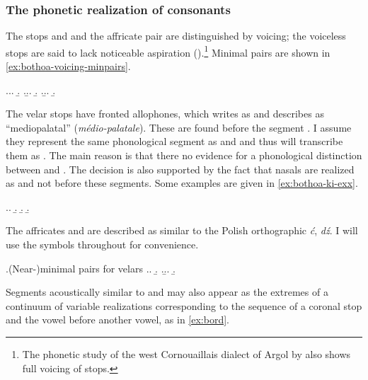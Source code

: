 \subsubsection{The phonetic realization of consonants}
\label{sec:phon-real-cons}

The stops \ipa{[p~t~k]} and \ipa{[b~d~ɡ]} and the affricate pair \ipa{[ʧ~dʒ]} are distinguished by  voicing; the voiceless stops are said to lack noticeable aspiration ().\footnote{The phonetic study of the west Cornouaillais dialect of Argol by \citet{Bot82} also shows full voicing of stops.} Minimal pairs are shown in \cref{ex:bothoa-voicing-minpairs}.

\ex.\label{ex:bothoa-voicing-minpairs}\a.\a.
\b.
\z.\b.\a.
\b.
\z.\b.\a.
\b.

The velar stops \ipa{[k~ɡ]} have fronted allophones, which \citet{humphreys95:_phonol_bothoa_saint_nicol_pelem} writes as \ipa{[c~ɟ]} and describes as \enquote{mediopalatal} (\textfrench{\emph{médio-palatale}}). These are found before the segment \ipa{[i]}. I assume they represent the same phonological segment as \ipa{[k]} and \ipa{[ɡ]} and thus will transcribe them as \ipa{[kʲ~ɡʲ]}. The main reason is that there no evidence for a phonological distinction between \ipa{[k~ɡ]} and \ipa{[kʲ~ɡʲ]}. The decision is also supported by the fact that nasals are realized as  and not  before these segments. Some examples are given in \ref{ex:bothoa-ki-exx}.

\ex.\label{ex:bothoa-ki-exx}\a.
\b.
\b.
\b.

The affricates  and  are described as similar to the  Polish orthographic \emph{\'c}, \emph{d\'z}. I will use the symbols \ipa{[ʧ~dʒ]} throughout for convenience.

\ex.(Near-)minimal pairs for velars
\a.\a.
\b.
\z.\b.\a.
\b.

\label{bothoa-phonetic-palatalization}Segments acoustically similar to  and  may also appear as the extremes of a continuum of variable realizations corresponding to the sequence of a coronal stop and the vowel \ipa{[i]} before another vowel, as in \cref{ex:bord}.

